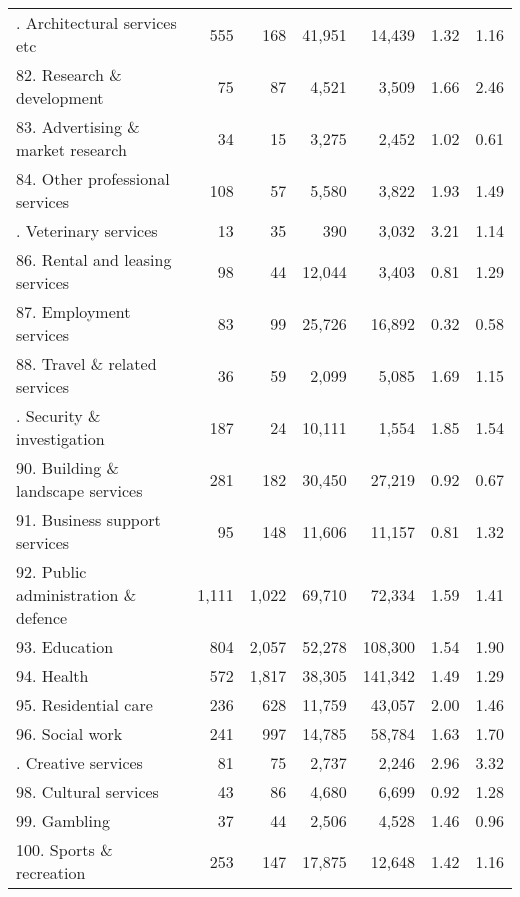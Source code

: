 {\begin{center}
\begin{longtable}{lrrrrrr}
     \hdashline[1pt/1pt]
    81. Architectural services etc & 555   & 168   & 41,951 & 14,439 & 1.32  & 1.16 \bigstrut[t]\\
    82. Research \& development & 75    & 87    & 4,521 & 3,509 & 1.66  & 2.46 \\
    83. Advertising \& market research & 34    & 15    & 3,275 & 2,452 & 1.02  & 0.61 \\
    84. Other professional services & 108   & 57    & 5,580 & 3,822 & 1.93  & 1.49 \bigstrut[b]\\
     \hdashline[1pt/1pt]
    85. Veterinary services & 13    & 35    & 390   & 3,032 & 3.21  & 1.14 \bigstrut[t]\\
    86. Rental and leasing services & 98    & 44    & 12,044 & 3,403 & 0.81  & 1.29 \\
    87. Employment services & 83    & 99    & 25,726 & 16,892 & 0.32  & 0.58 \\
    88. Travel \& related services & 36    & 59    & 2,099 & 5,085 & 1.69  & 1.15 \bigstrut[b]\\
     \hdashline[1pt/1pt]
    89. Security \& investigation & 187   & 24    & 10,111 & 1,554 & 1.85  & 1.54 \bigstrut[t]\\
    90. Building \& landscape services & 281   & 182   & 30,450 & 27,219 & 0.92  & 0.67 \\
    91. Business support services & 95    & 148   & 11,606 & 11,157 & 0.81  & 1.32 \\
    92. Public administration \& defence & 1,111 & 1,022 & 69,710 & 72,334 & 1.59  & 1.41 \bigstrut[b]\\
    93. Education & 804   & 2,057 & 52,278 & 108,300 & 1.54  & 1.90 \bigstrut[t]\\
    94. Health & 572   & 1,817 & 38,305 & 141,342 & 1.49  & 1.29 \\
    95. Residential care & 236   & 628   & 11,759 & 43,057 & 2.00  & 1.46 \\
    96. Social work & 241   & 997   & 14,785 & 58,784 & 1.63  & 1.70 \bigstrut[b]\\
     \hdashline[1pt/1pt]
    97. Creative services & 81    & 75    & 2,737 & 2,246 & 2.96  & 3.32 \bigstrut[t]\\
    98. Cultural services & 43    & 86    & 4,680 & 6,699 & 0.92  & 1.28 \\
    99. Gambling & 37    & 44    & 2,506 & 4,528 & 1.46  & 0.96 \\
    100. Sports \& recreation & 253   & 147   & 17,875 & 12,648 & 1.42  & 1.16 \bigstrut[b]\\

\end{longtable}
\end{center}}
